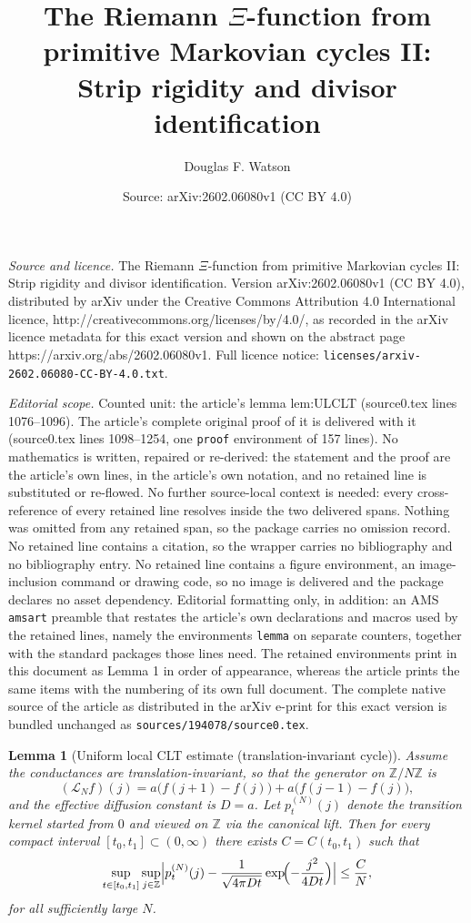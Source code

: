 \documentclass[10pt,a4paper]{amsart}
\title{The Riemann $\Xi$-function from primitive Markovian cycles II: Strip rigidity and divisor identification}
\author{Douglas F. Watson}
\date{Source: arXiv:2602.06080v1 (CC BY 4.0)}
\newtheorem{lemma}{Lemma}
\newcommand{\Z}{\mathbb{Z}}
\begin{document}
\maketitle

\noindent\emph{Source and licence.} The Riemann $\Xi$-function from primitive Markovian cycles II: Strip rigidity and divisor identification. Version arXiv:2602.06080v1 (CC BY 4.0), distributed by arXiv under the Creative Commons Attribution 4.0 International licence, http://creativecommons.org/licenses/by/4.0/, as recorded in the arXiv licence metadata for this exact version and shown on the abstract page https://arxiv.org/abs/2602.06080v1. Full licence notice: \texttt{licenses/arxiv-2602.06080-CC-BY-4.0.txt}.\par\smallskip

\noindent\textit{Editorial scope.} Counted unit: the article's lemma lem:ULCLT (source0.tex lines 1076--1096). The article's complete original proof of it is delivered with it (source0.tex lines 1098--1254, one \texttt{proof} environment of 157 lines). No mathematics is written, repaired or re-derived: the statement and the proof are the article's own lines, in the article's own notation, and no retained line is substituted or re-flowed.  No further source-local context is needed: every cross-reference of every retained line resolves inside the two delivered spans.  Nothing was omitted from any retained span, so the package carries no omission record.  No retained line contains a citation, so the wrapper carries no bibliography and no bibliography entry.  No retained line contains a figure environment, an image-inclusion command or drawing code, so no image is delivered and the package declares no asset dependency.  Editorial formatting only, in addition: an AMS \texttt{amsart} preamble that restates the article's own declarations and macros used by the retained lines, namely the environments \texttt{lemma} on separate counters, together with the standard packages those lines need.  The retained environments print in this document as Lemma 1 in order of appearance, whereas the article prints the same items with the numbering of its own full document.  The complete native source of the article as distributed in the arXiv e-print for this exact version is bundled unchanged as \texttt{sources/194078/source0.tex}.
\begin{lemma}[Uniform local CLT estimate (translation-invariant cycle)]
\label{lem:ULCLT}
Assume the conductances are translation-invariant, so that the generator on $\Z/N\Z$ is
\[
(\mathcal L_N f)(j)=a\bigl(f(j+1)-f(j)\bigr)+a\bigl(f(j-1)-f(j)\bigr),
\]
and the effective diffusion constant is $D=a$. Let $p_t^{(N)}(j)$ denote the transition
kernel started from $0$ and viewed on $\Z$ via the canonical lift. Then for every compact
interval $[t_0,t_1]\subset(0,\infty)$ there exists $C=C(t_0,t_1)$ such that
\[
\sup_{t\in[t_0,t_1]}\sup_{j\in\Z}
\Bigl|
p_t^{(N)}(j)
-
\frac{1}{\sqrt{4\pi Dt}}\exp\!\Bigl(-\frac{j^2}{4Dt}\Bigr)
\Bigr|
\le
\frac{C}{N},
\]
for all sufficiently large $N$.
\end{lemma}
\end{document}
